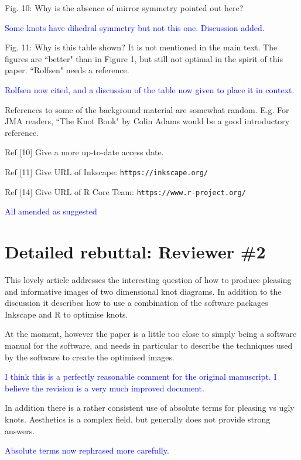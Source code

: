 \documentclass[12pt]{article}
\begin{document}
Fig. 10: Why is the absence of mirror symmetry pointed out here?

\textcolor{blue}{Some knots have dihedral symmetry but not this one.
  Discussion added.}

Fig. 11: Why is this table shown?  It is not mentioned in the main
text.  The figures are ``better" than in Figure 1, but still not
optimal in the spirit of this paper.  ``Rolfsen" needs a reference.


\textcolor{blue}{Rolfsen now cited, and a discussion of the table now
  given to place it in context.}

References to some of the background material are somewhat random.
E.g.  For JMA readers, ``The Knot Book" by Colin Adams would be a good
introductory reference.

Ref [10]  Give a more up-to-date access date.

Ref [11]  Give URL of  Inkscape:  {\tt https://inkscape.org/}

Ref [14]  Give URL of  R Core Team:  {\tt https://www.r-project.org/}


\textcolor{blue}{All amended as suggested}

\section*{Detailed rebuttal: Reviewer \#2}

This lovely article addresses the interesting question of
how to produce pleasing and informative images of two dimensional knot
diagrams. In addition to the discussion it describes how to use a
combination of the software packages Inkscape and R to optimise knots.

At the moment, however the paper is a little too close to simply being
a software manual for the software, and needs in particular to
describe the techniques used by the software to create the optimised
images.%

\textcolor{blue}{I think this is a perfectly reasonable comment for
  the original manuscript.  I believe the revision is a very much
  improved document.}


In addition there is a rather consistent use of absolute terms for
pleasing vs ugly knots. Aesthetics is a complex field, but generally
does not provide strong answers.


\textcolor{blue}{Absolute terms now rephrased more carefully.}%
\end{document}
